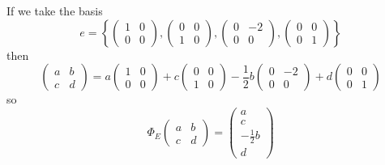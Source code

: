 \documentclass[10pt, a4paper]{article}
\begin{document}
\begin{example}
    If we take the basis
    \[
    e = \left\{\begin{pmatrix}
        1 & 0 \\ 0 & 0
    \end{pmatrix}, \begin{pmatrix}
        0 & 0 \\ 1 & 0
    \end{pmatrix}, \begin{pmatrix}
        0 & -2 \\ 0 & 0
    \end{pmatrix}, \begin{pmatrix}
        0 & 0 \\ 0 & 1
    \end{pmatrix}\right\}
    \]
    then
    \[
    \begin{pmatrix}
        a & b \\ c & d
    \end{pmatrix}
    =
    a\begin{pmatrix}
        1 & 0 \\ 0 & 0
    \end{pmatrix}
    +
    c\begin{pmatrix}
        0 & 0 \\ 1 & 0
    \end{pmatrix}
    -\frac{1}{2}b\begin{pmatrix}
        0 & -2 \\ 0 & 0
    \end{pmatrix}
    +
    d\begin{pmatrix}
        0 & 0 \\ 0 & 1
    \end{pmatrix}
    \]
    so
    \[
    \Phi_E \begin{pmatrix}
        a & b \\ c & d
    \end{pmatrix} = \begin{pmatrix}
        a \\ c \\ -\frac{1}{2}b \\ d
    \end{pmatrix}
    \]


\end{example}
\end{document}
